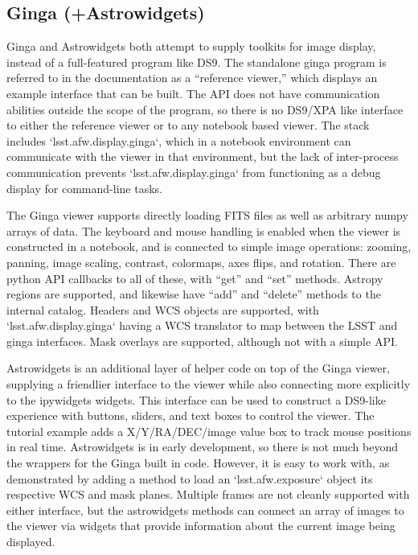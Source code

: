 \subsection{Ginga (+Astrowidgets)}

Ginga and Astrowidgets both attempt to supply toolkits for image display, instead of a full-featured program like DS9.  The standalone ginga program is referred to in the documentation as a ``reference viewer,'' which displays an example interface that can be built.  The API does not have communication abilities outside the scope of the program, so there is no DS9/XPA like interface to either the reference viewer or to any notebook based viewer.  The stack includes `lsst.afw.display.ginga`, which in a notebook environment can communicate with the viewer in that environment, but the lack of inter-process communication prevents `lsst.afw.display.ginga` from functioning as a debug display for command-line tasks.

The Ginga viewer supports directly loading FITS files as well as arbitrary numpy arrays of data.  The keyboard and mouse handling is enabled when the viewer is constructed in a notebook, and is connected to simple image operations: zooming, panning, image scaling, contrast, colormaps, axes flips, and rotation.  There are python API callbacks to all of these, with ``get'' and ``set'' methods.  Astropy regions are supported, and likewise have ``add'' and ``delete'' methods to the internal catalog.  Headers and WCS objects are supported, with `lsst.afw.display.ginga` having a WCS translator to map between the LSST and ginga interfaces.  Mask overlays are supported, although not with a simple API.

Astrowidgets is an additional layer of helper code on top of the Ginga viewer, supplying a friendlier interface to the viewer while also connecting more explicitly to the ipywidgets widgets.  This interface can be used to construct a DS9-like experience with buttons, sliders, and text boxes to control the viewer.  The tutorial example adds a X/Y/RA/DEC/image value box to track mouse positions in real time.  Astrowidgets is in early development, so there is not much beyond the wrappers for the Ginga built in code.  However, it is easy to work with, as demonstrated by adding a method to load an `lsst.afw.exposure` object its respective WCS and mask planes.  Multiple frames are not cleanly supported with either interface, but the astrowidgets methods can connect an array of images to the viewer via widgets that provide information about the current image being displayed.

